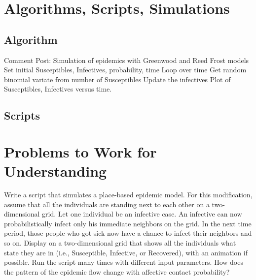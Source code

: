 \documentclass[12pt]{article}
\begin{document}
\hr

\section*{Algorithms, Scripts, Simulations}

\subsection*{Algorithm}

\begin{codebox}
  \zi Comment Post:  Simulation of epidemics with
  Greenwood and Reed Frost models
  \li Set initial Susceptibles, Infectives, probability, time
  \li Loop over time
  \li Get random binomial variate from number of Susceptibles
  \li Update the infectives
  \li \Return Plot of Susceptibles, Infectives versus time.
\end{codebox}
\subsection*{Scripts}



\hr

\section*{Problems to Work for Understanding}
\renewcommand{\theexerciseseries}{}
\renewcommand{\theexercise}{\arabic{exercise}}

\begin{exercise}
 Write a script that simulates a place-based epidemic model.  For
  this modification, assume that all the individuals are standing next
  to each other on a two-dimensional grid.  Let one individual be an
  infective case. An infective can now probabilistically infect only his immediate
  neighbors on the grid.  In the next time period, those people who
  got sick now have a chance to infect their neighbors and so on.
  Display on a two-dimensional grid that shows all the individuals
  what state they are in (i.e., Susceptible, Infective, or
  Recovered), with an animation if possible. Run the script many
  times with different input parameters.
  How does the pattern of the epidemic flow change with affective contact probability?
\end{exercise}
\end{document}
